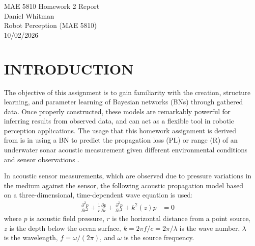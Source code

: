\documentclass[12pt]{article}
\newcommand{\mainmatter}{\clearpage\setcounter{page}{1}\pagenumbering{arabic}}
\begin{document}
\begin{titlepage}
\begin{center}
    \vspace*{\fill}
    {\Huge MAE 5810 Homework 2 Report}\\

    \vspace{4\baselineskip}
    Daniel Whitman\\
    Robot Perception (MAE 5810)\\
    10/02/2026
\end{center}


\vspace*{\fill}
\end{titlepage}

\mainmatter
\section{INTRODUCTION}\label{sec:intro}
The objective of this assignment is to gain familiarity with the creation, structure learning, and parameter learning of Bayesian networks (BNs) through gathered data. Once properly constructed, these models are remarkably powerful for inferring results from observed data, and can act as a flexible tool in robotic perception applications. The usage that this homework assignment is derived from is in using a BN to predict the propagation loss (PL) or range (R) of an underwater sonar acoustic measurement given different environmental conditions and sensor observations \cite{Cai2007BNMoAS}.

In acoustic sensor measurements, which are observed due to pressure variations in the medium against the sensor, the following acoustic propagation model based on a three-dimensional, time-dependent wave equation \cite{Etter1996UAM} is used:
\begin{align}\label{eqn:acoustic}
    \frac{\partial^2 p}{\partial r^2}+\frac1r\frac{\partial p}{\partial r}+\frac{\partial^2p}{\partial z^2}+k^2(z)p&=0
\end{align}
where $p$ is acoustic field pressure, $r$ is the horizontal distance from a point source, $z$ is the depth below the ocean surface, $k=2\pi f/c=2\pi/\lambda$ is the wave number, $\lambda$ is the wavelength, $f=\omega/(2\pi)$, and
$\omega$ is the source frequency.
\end{document}
